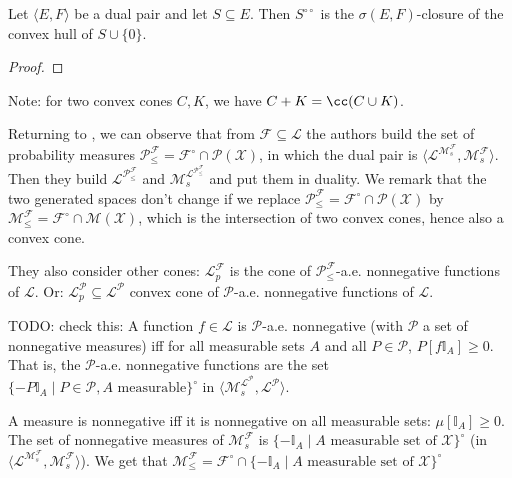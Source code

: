 \begin{theorem}\label{thm:bipolar_theorem}
Let $\langle E, F \rangle$ be a dual pair and let $S \subseteq E$.
Then $S^{\circ\circ}$ is the $\sigma(E, F)$-closure of the convex hull of $S \cup \{0\}$.
\end{theorem}

\begin{proof}

\end{proof}

Note: for two convex cones $C, K$, we have $C + K = \cc(C \cup K)$.

Returning to \cite{larsson2025variables}, we can observe that from $\mathcal{F} \subseteq \mathcal{L}$ the authors build the set of probability measures $\mathcal{P}^{\mathcal{F}}_{\le} = \mathcal{F}^\circ \cap \mathcal{P}(\mathcal{X})$, in which the dual pair is $\langle \mathcal{L}^{\mathcal{M}_s^{\mathcal{F}}}, \mathcal{M}_s^{\mathcal{F}} \rangle$.
Then they build $\mathcal{L}^{\mathcal{P}^{\mathcal{F}}_{\le}}$ and $\mathcal{M}_s^{\mathcal{L}^{\mathcal{P}^{\mathcal{F}}_{\le}}}$ and put them in duality.
We remark that the two generated spaces don't change if we replace $\mathcal{P}^{\mathcal{F}}_{\le} = \mathcal{F}^\circ \cap \mathcal{P}(\mathcal{X})$ by $\mathcal{M}^{\mathcal{F}}_{\le} = \mathcal{F}^\circ \cap \mathcal{M}(\mathcal{X})$, which is the intersection of two convex cones, hence also a convex cone.

They also consider other cones: $\mathcal{L}_p^{\mathcal{F}}$ is the cone of $\mathcal{P}^{\mathcal{F}}_{\le}$-a.e. nonnegative functions of $\mathcal{L}$.
Or: $\mathcal{L}_p^{\mathcal{P}} \subseteq \mathcal{L}^{\mathcal{P}}$ convex cone of $\mathcal{P}$-a.e. nonnegative functions of $\mathcal{L}$.

TODO: check this:
A function $f \in \mathcal{L}$ is $\mathcal{P}$-a.e. nonnegative (with $\mathcal{P}$ a set of nonnegative measures) iff for all measurable sets $A$ and all $P \in \mathcal{P}$, $P[f \mathbb{I}_A] \ge 0$.
That is, the $\mathcal{P}$-a.e. nonnegative functions are the set $\{-P \mathbb{I}_A \mid P \in \mathcal{P}, A \text{ measurable}\}^\circ$ in $\langle \mathcal{M}_s^{\mathcal{L}^{\mathcal{P}}}, \mathcal{L}^{\mathcal{P}}\rangle$.

A measure is nonnegative iff it is nonnegative on all measurable sets: $\mu[\mathbb{I}_A] \ge 0$.
The set of nonnegative measures of $\mathcal{M}_s^{\mathcal{F}}$ is $\{- \mathbb{I}_A \mid A \text{ measurable set of } \mathcal{X}\}^\circ$ (in $\langle \mathcal{L}^{\mathcal{M}_s^{\mathcal{F}}}, \mathcal{M}_s^{\mathcal{F}}\rangle$).
We get that $\mathcal{M}^{\mathcal{F}}_{\le} = \mathcal{F}^\circ \cap \{- \mathbb{I}_A \mid A \text{ measurable set of } \mathcal{X}\}^\circ$

